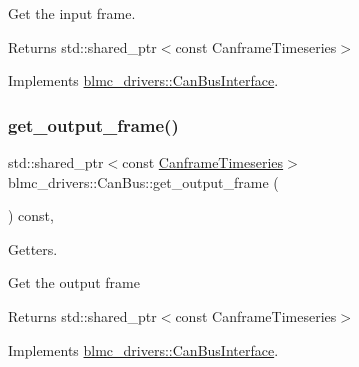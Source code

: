 Get the input frame. 

\begin{DoxyReturn}{Returns}
std\+::shared\+\_\+ptr$<$const Canframe\+Timeseries$>$ 
\end{DoxyReturn}


Implements \hyperlink{classblmc__drivers_1_1CanBusInterface_a40b62805094dc0a454695a988ab0d403}{blmc\+\_\+drivers\+::\+Can\+Bus\+Interface}.

\mbox{\label{classblmc__drivers_1_1CanBus_a449fa3c1b73a9282193ce85b56e9a729}} 
\subsubsection{\texorpdfstring{get\+\_\+output\+\_\+frame()}{get\_output\_frame()}}
{\footnotesize\ttfamily std\+::shared\+\_\+ptr$<$const \hyperlink{classblmc__drivers_1_1CanBusInterface_a2da2627c961927f48359ae7d7e1aa4da}{Canframe\+Timeseries}$>$ blmc\+\_\+drivers\+::\+Can\+Bus\+::get\+\_\+output\+\_\+frame (\begin{DoxyParamCaption}{ }\end{DoxyParamCaption}) const\hspace{0.3cm}{\ttfamily [inline]}, {\ttfamily [virtual]}}



Getters. 

Get the output frame

\begin{DoxyReturn}{Returns}
std\+::shared\+\_\+ptr$<$const Canframe\+Timeseries$>$ 
\end{DoxyReturn}


Implements \hyperlink{classblmc__drivers_1_1CanBusInterface_ac169b1c119b707d2946a999b81fb5a46}{blmc\+\_\+drivers\+::\+Can\+Bus\+Interface}.

\mbox{\label{classblmc__drivers_1_1CanBus_a862e9898a6607ac2e00e712c30e7f348}} 
